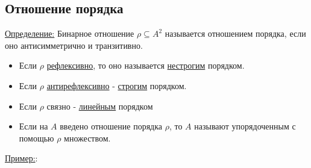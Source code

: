 \documentclass[12pt]{article}
\begin{document}
    \subsection{Отношение порядка}
    \underline{Определение:} Бинарное отношение $\rho \subseteq A^2$ называется отношением порядка, если
    оно антисимметрично и транзитивно.
    \begin{itemize}
        \item Если $\rho$ \underline{рефлексивно}, то оно называется \underline{нестрогим} порядком.
        \item Если $\rho$ \underline{антирефлексивно} - \underline{строгим} порядком.
        \item Если $\rho$ связно - \underline{линейным} порядком
        \item Если на $A$ введено отношение порядка $\rho$, то $A$ называют упорядоченным с помощью
        $\rho$ множеством.
    \end{itemize}
    \underline{Пример:}:
\end{document}

